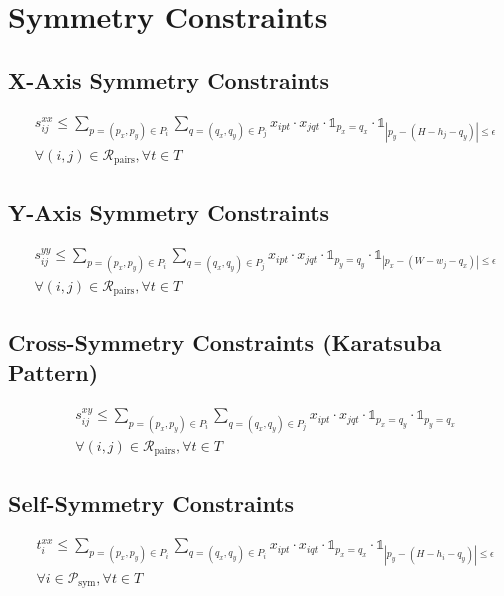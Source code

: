 \documentclass{article}
\begin{document}
\section{Symmetry Constraints}

\subsection{X-Axis Symmetry Constraints}
\begin{align}
& s_{ij}^{xx} \leq \sum_{p=(p_x,p_y) \in P_i} \sum_{q=(q_x,q_y) \in P_j} x_{ipt} \cdot x_{jqt} \cdot \mathbb{1}_{p_x = q_x} \cdot \mathbb{1}_{|p_y - (H - h_j - q_y)| \leq \epsilon} \\
& \forall (i,j) \in \mathcal{R}_{\text{pairs}}, \forall t \in T
\end{align}

\subsection{Y-Axis Symmetry Constraints}
\begin{align}
& s_{ij}^{yy} \leq \sum_{p=(p_x,p_y) \in P_i} \sum_{q=(q_x,q_y) \in P_j} x_{ipt} \cdot x_{jqt} \cdot \mathbb{1}_{p_y = q_y} \cdot \mathbb{1}_{|p_x - (W - w_j - q_x)| \leq \epsilon} \\
& \forall (i,j) \in \mathcal{R}_{\text{pairs}}, \forall t \in T
\end{align}

\subsection{Cross-Symmetry Constraints (Karatsuba Pattern)}
\begin{align}
& s_{ij}^{xy} \leq \sum_{p=(p_x,p_y) \in P_i} \sum_{q=(q_x,q_y) \in P_j} x_{ipt} \cdot x_{jqt} \cdot \mathbb{1}_{p_x = q_y} \cdot \mathbb{1}_{p_y = q_x} \\
& \forall (i,j) \in \mathcal{R}_{\text{pairs}}, \forall t \in T
\end{align}

\subsection{Self-Symmetry Constraints}
\begin{align}
& t_{i}^{xx} \leq \sum_{p=(p_x,p_y) \in P_i} \sum_{q=(q_x,q_y) \in P_i} x_{ipt} \cdot x_{iqt} \cdot \mathbb{1}_{p_x = q_x} \cdot \mathbb{1}_{|p_y - (H - h_i - q_y)| \leq \epsilon} \\
& \forall i \in \mathcal{P}_{\text{sym}}, \forall t \in T
\end{align}
\end{document}

